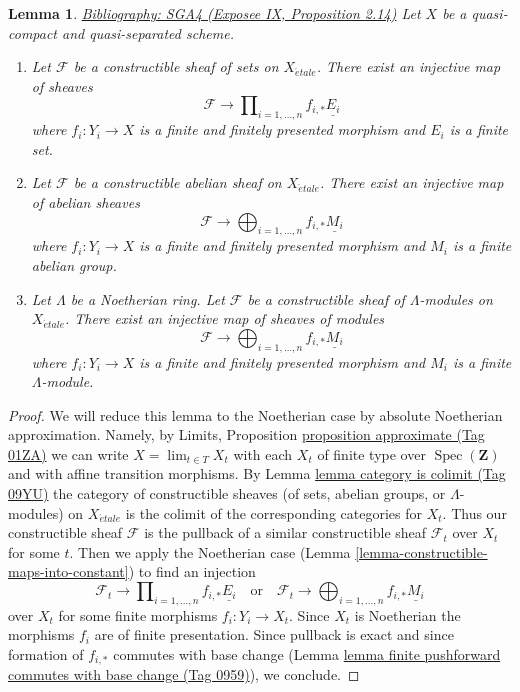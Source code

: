 \documentclass{amsart}
\newenvironment{reference}{\comment}{\endcomment}
\theoremstyle{plain}
\newtheorem{lemma}[subsection]{Lemma}
\theoremstyle{definition}
\theoremstyle{remark}
\numberwithin{equation}{subsection}
\def\lim{\mathop{\mathrm{lim}}\nolimits}
\def\Spec{\mathop{\mathrm{Spec}}}
\def\etale{{\acute{e}tale}}
\begin{document}
\begin{lemma}
\label{lemma-constructible-maps-into-constant-general}
\begin{reference}
\href{https://stacks.math.columbia.edu/bibliography}{Bibliography: SGA4 (Exposee IX, Proposition 2.14)}
\end{reference}
Let $X$ be a quasi-compact and quasi-separated scheme.
\begin{enumerate}
\item Let $\mathcal{F}$ be a constructible sheaf of sets on $X_\etale$.
There exist an injective map of sheaves
$$
\mathcal{F} \longrightarrow
\prod\nolimits_{i = 1, \ldots, n} f_{i, *}\underline{E_i}
$$
where $f_i : Y_i \to X$ is a finite and finitely presented morphism and
$E_i$ is a finite set.
\item Let $\mathcal{F}$ be a constructible abelian sheaf on $X_\etale$.
There exist an injective map of abelian sheaves
$$
\mathcal{F} \longrightarrow
\bigoplus\nolimits_{i = 1, \ldots, n} f_{i, *}\underline{M_i}
$$
where $f_i : Y_i \to X$ is a finite and finitely presented morphism and
$M_i$ is a finite abelian group.
\item Let $\Lambda$ be a Noetherian ring.
Let $\mathcal{F}$ be a constructible sheaf of $\Lambda$-modules on $X_\etale$.
There exist an injective map of sheaves of modules
$$
\mathcal{F} \longrightarrow
\bigoplus\nolimits_{i = 1, \ldots, n} f_{i, *}\underline{M_i}
$$
where $f_i : Y_i \to X$ is a finite and finitely presented morphism and
$M_i$ is a finite $\Lambda$-module.
\end{enumerate}
\end{lemma}

\begin{proof}
We will reduce this lemma to the Noetherian case by absolute Noetherian
approximation. Namely, by
Limits, Proposition \href{https://stacks.math.columbia.edu/tag/01ZA}{proposition approximate (Tag 01ZA)}
we can write $X = \lim_{t \in T} X_t$ with each $X_t$ of finite type over
$\Spec(\mathbf{Z})$ and with affine transition morphisms. By
Lemma \href{https://stacks.math.columbia.edu/tag/09YU}{lemma category is colimit (Tag 09YU)}
the category of constructible sheaves (of sets, abelian groups, or
$\Lambda$-modules) on $X_\etale$ is the colimit of the corresponding
categories for $X_t$. Thus our constructible sheaf $\mathcal{F}$
is the pullback of a similar constructible sheaf $\mathcal{F}_t$
over $X_t$ for some $t$. Then we apply the Noetherian case
(Lemma \ref{lemma-constructible-maps-into-constant})
to find an injection
$$
\mathcal{F}_t \longrightarrow
\prod\nolimits_{i = 1, \ldots, n} f_{i, *}\underline{E_i}
\quad\text{or}\quad
\mathcal{F}_t \longrightarrow
\bigoplus\nolimits_{i = 1, \ldots, n} f_{i, *}\underline{M_i}
$$
over $X_t$ for some finite morphisms $f_i : Y_i \to X_t$.
Since $X_t$ is Noetherian the morphisms $f_i$ are of finite presentation.
Since pullback is exact and since formation of $f_{i, *}$ commutes
with base change
(Lemma \href{https://stacks.math.columbia.edu/tag/0959}{lemma finite pushforward commutes with base change (Tag 0959)}), we conclude.
\end{proof}
\end{document}
